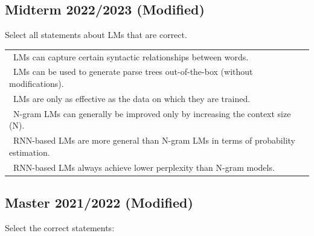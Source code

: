 \documentclass{../extra/aakpract/aakpract}
\begin{document}
	
	\subsection{Midterm 2022/2023 (Modified)}
	
	Select all statements about LMs that are correct.
	
	\begin{longtable}{|p{}|}
		\hline 
		\Square\ LMs can capture certain syntactic relationships between words.\\
		\Square\ LMs can be used to generate parse trees out-of-the-box (without modifications).\\
		\Square\ LMs are only as effective as the data on which they are trained.\\
		\Square\ N-gram LMs can generally be improved only by increasing the context size (N).\\
		\Square\ RNN-based LMs are more general than N-gram LMs in terms of probability estimation.\\
		\Square\ RNN-based LMs always achieve lower perplexity than N-gram models.\\
		\hline
	\end{longtable}

	\subsection{Master 2021/2022 (Modified)}
	
	Select the correct statements:
	
\end{document}
